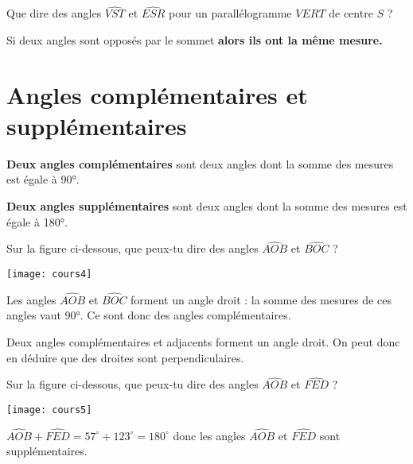 Que dire des angles $\widehat{VST}$ et $\widehat{ESR}$ pour un parallélogramme $VERT$ de centre $S$ ?


\begin{aconnaitre}
Si deux angles sont opposés par le sommet \textbf{alors ils ont la même mesure.}
\end{aconnaitre}



\section{Angles complémentaires et supplémentaires}

\begin{aconnaitre}
\textbf{Deux angles complémentaires} sont deux angles dont la somme des mesures est égale à 90°.

\vspace{.5em}

\textbf{Deux angles supplémentaires} sont deux angles dont la somme des mesures est égale à 180°.
\end{aconnaitre}

\begin{exemple*1}
Sur la figure ci-dessous, que peux-tu dire des angles $\widehat{AOB}$ et $\widehat{BOC}$ ?

\begin{center}
    \texttt{[image: cours4]}
\end{center}

\correction
Les angles $\widehat{AOB}$ et $\widehat{BOC}$ forment un angle droit : la somme des mesures de ces angles vaut 90°. Ce sont donc des angles complémentaires.
\end{exemple*1}

\begin{remarque}
Deux angles complémentaires et adjacents forment un angle droit. On peut donc en déduire que des droites sont perpendiculaires.
\end{remarque}


\begin{exemple*1}
Sur la figure ci-dessous, que peux-tu dire des angles $\widehat{AOB}$ et $\widehat{FED}$ ?

\begin{center}
    \texttt{[image: cours5]}
\end{center}

\correction
$\widehat{AOB}+\widehat{FED}=57^\circ+123^\circ=180^\circ$ donc les angles $\widehat{AOB}$ et $\widehat{FED}$ sont supplémentaires.
\end{exemple*1}

